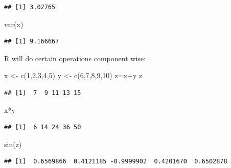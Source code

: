 \documentclass[
]{article}
\newenvironment{Shaded}{\begin{snugshade}}{\end{snugshade}}
\newcommand{\DecValTok}[1]{\textcolor[rgb]{0.00,0.00,0.81}{#1}}
\newcommand{\FunctionTok}[1]{\textcolor[rgb]{0.00,0.00,0.00}{#1}}
\newcommand{\NormalTok}[1]{#1}
\newcommand{\OtherTok}[1]{\textcolor[rgb]{0.56,0.35,0.01}{#1}}
\newcommand{\SpecialCharTok}[1]{\textcolor[rgb]{0.00,0.00,0.00}{#1}}
\theoremstyle{definition}
\theoremstyle{definition}
\theoremstyle{definition}
\theoremstyle{remark}
\begin{document}
\begin{verbatim}
## [1] 3.02765
\end{verbatim}

\begin{Shaded}
\begin{Highlighting}[]
\FunctionTok{var}\NormalTok{(x)}
\end{Highlighting}
\end{Shaded}

\begin{verbatim}
## [1] 9.166667
\end{verbatim}

R will do certain operations component wise:

\begin{Shaded}
\begin{Highlighting}[]
\NormalTok{ x }\OtherTok{\textless{}{-}} \FunctionTok{c}\NormalTok{(}\DecValTok{1}\NormalTok{,}\DecValTok{2}\NormalTok{,}\DecValTok{3}\NormalTok{,}\DecValTok{4}\NormalTok{,}\DecValTok{5}\NormalTok{)}
\NormalTok{y }\OtherTok{\textless{}{-}} \FunctionTok{c}\NormalTok{(}\DecValTok{6}\NormalTok{,}\DecValTok{7}\NormalTok{,}\DecValTok{8}\NormalTok{,}\DecValTok{9}\NormalTok{,}\DecValTok{10}\NormalTok{)}
\NormalTok{z}\OtherTok{=}\NormalTok{x}\SpecialCharTok{+}\NormalTok{y}
\NormalTok{z}
\end{Highlighting}
\end{Shaded}

\begin{verbatim}
## [1]  7  9 11 13 15
\end{verbatim}

\begin{Shaded}
\begin{Highlighting}[]
\NormalTok{x}\SpecialCharTok{*}\NormalTok{y}
\end{Highlighting}
\end{Shaded}

\begin{verbatim}
## [1]  6 14 24 36 50
\end{verbatim}

\begin{Shaded}
\begin{Highlighting}[]
\FunctionTok{sin}\NormalTok{(z)}
\end{Highlighting}
\end{Shaded}

\begin{verbatim}
## [1]  0.6569866  0.4121185 -0.9999902  0.4201670  0.6502878
\end{verbatim}
\end{document}
